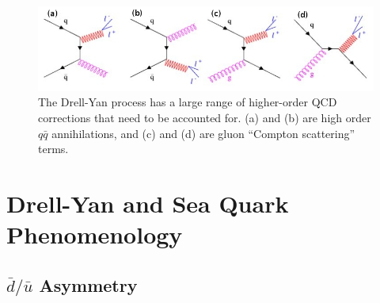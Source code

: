 
\begin{figure}[h]
	\centering
	\includegraphics[width=\textwidth]{figures/background/DY.jpeg}
	\caption{The Drell-Yan process has a large range of higher-order QCD corrections that need to be accounted for. 
		(a) and (b) are high order $q\bar{q}$ annihilations, and (c) and (d) are gluon ``Compton scattering'' terms.}
	\label{fig:nlo-dy}
\end{figure}

\section{Drell-Yan and Sea Quark Phenomenology}

\subsection{$\bar{d}/\bar{u}$ Asymmetry}

